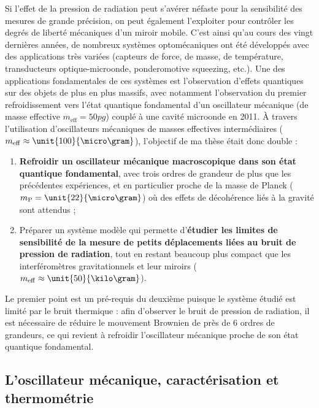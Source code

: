\documentclass[12pt,a4paper]{article}
\begin{document}
Si l'effet de la pression de radiation peut s'avérer néfaste pour la sensibilité des mesures de grande précision, on peut également l'exploiter pour contrôler les degrés de liberté mécaniques d'un miroir mobile.
C'est ainsi qu'au cours des vingt dernières années, de nombreux systèmes optomécaniques ont été développés avec des applications très variées (capteurs de force, de masse, de température, transducteurs optique-microonde, ponderomotive squeezing, etc.).
Une des applications fondamentales de ces systèmes est l'observation d'effets quantiques sur des objets de plus en plus massifs, avec notamment l'observation du premier refroidissement vers l'état quantique fondamental d'un oscillateur mécanique (de masse effective $m_\mathrm{eff} = \unit{50}{pg}$) couplé à une cavité microonde en 2011.
\`A travers l'utilisation d'oscillateurs mécaniques de masses effectives intermédiaires ($m_\mathrm{eff} \approx \unit{100}{\micro\gram}$), l'objectif de ma thèse était donc double :
\begin{enumerate}
\item \textbf{Refroidir un oscillateur mécanique macroscopique dans son état quantique fondamental}, avec trois ordres de grandeur de plus que les précédentes expériences, et en particulier proche de la masse de Planck ($m_\mathrm{P}=\unit{22}{\micro\gram}$) où des effets de décohérence liés à la gravité sont attendus ;
\item Préparer un système modèle qui permette d'\textbf{étudier les limites de sensibilité de la mesure de petits déplacements liées au bruit de pression de radiation}, tout en restant beaucoup plus compact que les interféromètres gravitationnels et leur miroirs ($m_\mathrm{eff}\approx\unit{50}{\kilo\gram}$).
\end{enumerate}
Le premier point est un pré-requis du deuxième puisque le système étudié est limité par le bruit thermique : afin d'observer le bruit de pression de radiation, il est nécessaire de réduire le mouvement Brownien de près de 6 ordres de grandeurs, ce qui revient à refroidir l'oscillateur mécanique proche de son état quantique fondamental.

\subsection{L'oscillateur mécanique, caractérisation et thermométrie}
\end{document}
